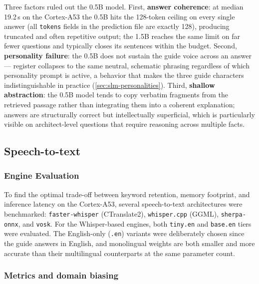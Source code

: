 \documentclass[11pt,a4paper]{article}
\begin{document}
Three factors ruled out the 0.5B model.
First, \textbf{answer coherence}: at median 19.2\,s on the Cortex-A53 the
0.5B hits the 128-token ceiling on every single answer (all \texttt{tokens}
fields in the prediction file are exactly 128), producing truncated and
often repetitive output; the 1.5B reaches the same limit on far fewer
questions and typically closes its sentences within the budget.
Second, \textbf{personality failure}: the 0.5B does not sustain the guide
voice across an answer --- register collapses to the same neutral,
schematic phrasing regardless of which personality prompt is active, a
behavior that makes the three guide characters indistinguishable in
practice (\cref{sec:slm-personalities}).
Third, \textbf{shallow abstraction}: the 0.5B model tends to copy verbatim
fragments from the retrieved passage rather than integrating them into a
coherent explanation; answers are structurally correct but intellectually
superficial, which is particularly visible on architect-level questions
that require reasoning across multiple facts.

\subsection{Speech-to-text}
\label{sec:stt}

\subsubsection{Engine Evaluation}

To find the optimal trade-off between keyword retention, memory footprint, and inference latency on the Cortex-A53, several speech-to-text architectures were benchmarked: \texttt{faster-whisper} (CTranslate2), \texttt{whisper.cpp} (GGML), \texttt{sherpa-onnx}, and \texttt{vosk}. For the Whisper-based engines, both \texttt{tiny.en} and \texttt{base.en} tiers were evaluated. The English-only (\texttt{.en}) variants were deliberately chosen since the guide answers in English, and monolingual weights are both smaller and more accurate than their multilingual counterparts at the same parameter count.

\subsubsection{Metrics and domain biasing}
\end{document}
